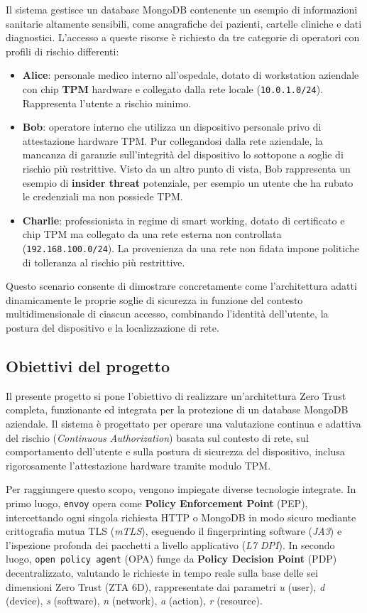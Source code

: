 Il sistema gestisce un database MongoDB contenente un esempio di informazioni sanitarie altamente sensibili, come anagrafiche dei pazienti, cartelle cliniche e dati diagnostici. L'accesso a queste risorse è richiesto da tre categorie di operatori con profili di rischio differenti:
\begin{itemize}
    \item \textbf{Alice}: personale medico interno all'ospedale, dotato di workstation aziendale con chip \textbf{TPM} hardware e collegato dalla rete locale (\texttt{10.0.1.0/24}). Rappresenta l'utente a rischio minimo.
    \item \textbf{Bob}: operatore interno che utilizza un dispositivo personale privo di attestazione hardware TPM. Pur collegandosi dalla rete aziendale, la mancanza di garanzie sull'integrità del dispositivo lo sottopone a soglie di rischio più restrittive. Visto da un altro punto di vista, Bob rappresenta un esempio di \textbf{insider threat} potenziale, per esempio un utente che ha rubato le credenziali ma non possiede TPM.
    \item \textbf{Charlie}: professionista in regime di smart working, dotato di certificato e chip TPM ma collegato da una rete esterna non controllata (\texttt{192.168.100.0/24}). La provenienza da una rete non fidata impone politiche di tolleranza al rischio più restrittive.
\end{itemize}
Questo scenario consente di dimostrare concretamente come l'architettura adatti dinamicamente le proprie soglie di sicurezza in funzione del contesto multidimensionale di ciascun accesso, combinando l'identità dell'utente, la postura del dispositivo e la localizzazione di rete.

\subsection{Obiettivi del progetto}
Il presente progetto si pone l'obiettivo di realizzare un'architettura Zero Trust completa, funzionante ed integrata per la protezione di un database MongoDB aziendale. Il sistema è progettato per operare una valutazione continua e adattiva del rischio (\textit{Continuous Authorization}) basata sul contesto di rete, sul comportamento dell'utente e sulla postura di sicurezza del dispositivo, inclusa rigorosamente l'attestazione hardware tramite modulo TPM.

Per raggiungere questo scopo, vengono impiegate diverse tecnologie integrate. In primo luogo, \texttt{envoy} opera come \textbf{Policy Enforcement Point} (PEP), intercettando ogni singola richiesta HTTP o MongoDB in modo sicuro mediante crittografia mutua TLS (\textit{mTLS}), eseguendo il fingerprinting software (\textit{JA3}) e l'ispezione profonda dei pacchetti a livello applicativo (\textit{L7 DPI}). In secondo luogo, \texttt{open policy agent} (OPA) funge da \textbf{Policy Decision Point} (PDP) decentralizzato, valutando le richieste in tempo reale sulla base delle sei dimensioni Zero Trust (ZTA 6D), rappresentate dai parametri \textit{u} (user), \textit{d} (device), \textit{s} (software), \textit{n} (network), \textit{a} (action), \textit{r} (resource).

